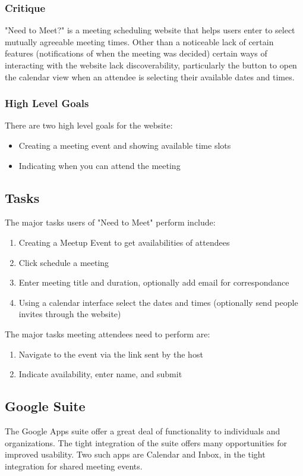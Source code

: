 \documentclass{sigchi}
\begin{document}
\subsubsection{Critique}
"Need to Meet?" is a meeting scheduling website that helps users
enter to select mutually agreeable meeting times. Other than a noticeable 
lack of certain features (notifications of when the meeting was decided)
certain ways of interacting with the website lack discoverability, particularly
the button to open the calendar view when an attendee is selecting their available
dates and times.
\subsubsection{High Level Goals}
There are two high level goals for the website:
\begin{itemize}
	\item Creating a meeting event and showing available time slots
	\item Indicating when you can attend the meeting
\end{itemize}
\subsection{Tasks}
The major tasks users of "Need to Meet" perform include: 
\begin{enumerate}
\item Creating a Meetup Event to get availabilities of attendees
\item Click schedule a meeting
\item Enter meeting title and duration, optionally add email for correspondance
\item Using a calendar interface select the dates and times (optionally 
send people invites through the website)
\end{enumerate}
The major tasks meeting attendees need to perform are: 
\begin{enumerate}
\item Navigate to the event via the link sent by the host
\item Indicate availability, enter name, and submit
\end{enumerate}

\subsection{Google Suite}
The Google Apps suite offer a great deal of functionality to individuals and organizations.
The tight integration of the suite offers many opportunities for improved usability.
Two such apps are Calendar and Inbox, in the tight integration for shared meeting events. 
\end{document}
